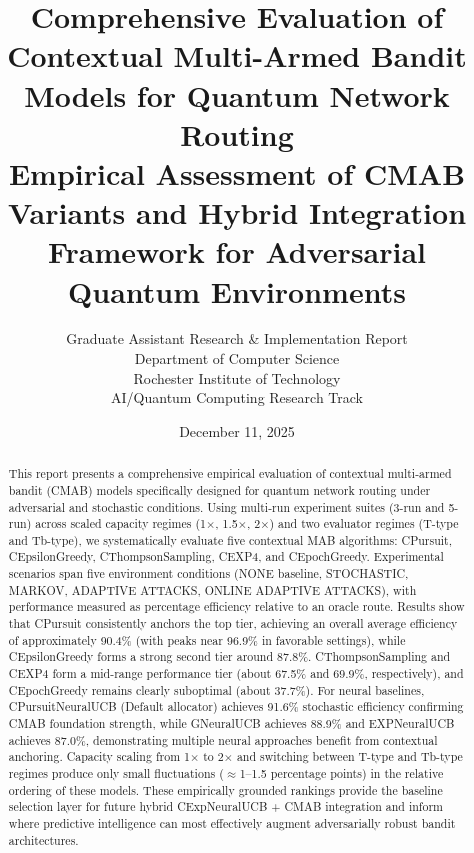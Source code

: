 \documentclass[12pt,a4paper]{article}
\title{\textbf{Comprehensive Evaluation of Contextual Multi-Armed Bandit Models for Quantum Network Routing}\\
\large{Empirical Assessment of CMAB Variants and Hybrid Integration Framework for Adversarial Quantum Environments}}
\author{Graduate Assistant Research \& Implementation Report\\ 
Department of Computer Science \\ 
Rochester Institute of Technology \\ 
AI/Quantum Computing Research Track}
\date{December 11, 2025}
\begin{document}
\maketitle

\begin{abstract}
This report presents a comprehensive empirical evaluation of contextual multi-armed bandit (CMAB) models specifically designed for quantum network routing under adversarial and stochastic conditions. Using multi-run experiment suites (3-run and 5-run) across scaled capacity regimes (1$\times$, 1.5$\times$, 2$\times$) and two evaluator regimes (T-type and Tb-type), we systematically evaluate five contextual MAB algorithms: CPursuit, CEpsilonGreedy, CThompsonSampling, CEXP4, and CEpochGreedy. Experimental scenarios span five environment conditions (NONE baseline, STOCHASTIC, MARKOV, ADAPTIVE ATTACKS, ONLINE ADAPTIVE ATTACKS), with performance measured as percentage efficiency relative to an oracle route. Results show that CPursuit consistently anchors the top tier, achieving an overall average efficiency of approximately 90.4\% (with peaks near 96.9\% in favorable settings), while CEpsilonGreedy forms a strong second tier around 87.8\%. CThompsonSampling and CEXP4 form a mid-range performance tier (about 67.5\% and 69.9\%, respectively), and CEpochGreedy remains clearly suboptimal (about 37.7\%). For neural baselines, CPursuitNeuralUCB (Default allocator) achieves 91.6\% stochastic efficiency confirming CMAB foundation strength, while GNeuralUCB achieves 88.9\% and EXPNeuralUCB achieves 87.0\%, demonstrating multiple neural approaches benefit from contextual anchoring. Capacity scaling from 1$\times$ to 2$\times$ and switching between T-type and Tb-type regimes produce only small fluctuations ($\approx$1--1.5 percentage points) in the relative ordering of these models. These empirically grounded rankings provide the baseline selection layer for future hybrid CExpNeuralUCB + CMAB integration and inform where predictive intelligence can most effectively augment adversarially robust bandit architectures.
\end{abstract}

\newpage
{\tableofcontents}

\newpage
\end{document}
